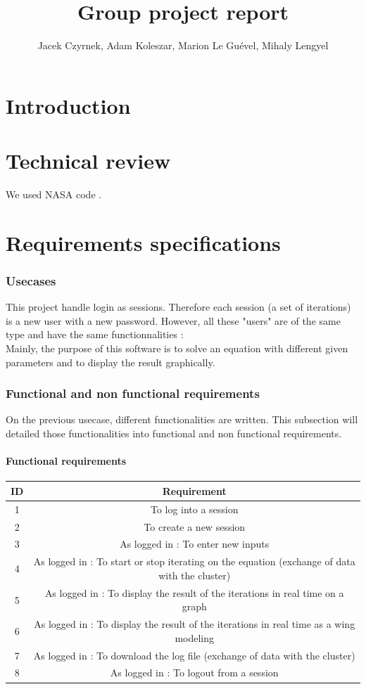 \documentclass[10pt,a4paper]{report}
\author{Jacek Czyrnek, Adam Koleszar, Marion Le Guével, Mihaly Lengyel}
\title{Group project report}
\begin{document}
\maketitle
\tableofcontents
\chapter{Introduction}


\chapter{Technical review}
We used NASA code \cite{WWW:NASA}.

\chapter{Requirements specifications}
	\subsection{Usecases}
This project handle login as sessions. Therefore each session (a set of iterations) is a new user with a new password.  However, all these "users" are of the same type and have the same functionnalities : \\
Mainly, the purpose of this software is to solve an equation with different given parameters and to display the result graphically.
	\subsection{Functional and non functional requirements}
On the previous usecase, different functionalities are written. This subsection will detailed those functionalities into functional and non functional requirements.
		\subsubsection{Functional requirements}
\begin{tabular}{|c|c|}
\hline 
\textbf{ID} & \textbf{Requirement} \\ 
\hline 
1 & To log into a session \\ 
\hline 
2 & To create a new session \\ 
\hline 
3 & As logged in : To enter new inputs \\ 
\hline
4 & As logged in : To start or stop iterating on the equation (exchange of data with the cluster) \\ 
\hline
5 & As logged in : To display the result of the iterations in real time on a graph \\ 
\hline
6 & As logged in : To display the result of the iterations in real time as a wing modeling \\ 
\hline
7 & As logged in : To download the log file (exchange of data with the cluster)\\ 
\hline
8 & As logged in : To logout from a session \\ 
\hline
\end{tabular} 
\end{document}
